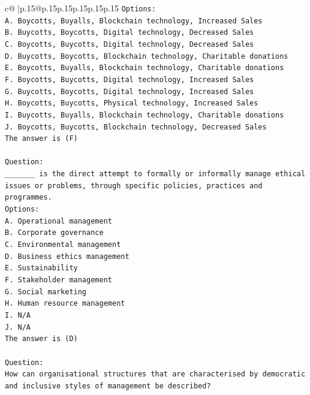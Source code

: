 \documentclass{article}
\begin{document}
{\begin{supertabular}{c@{$\;$}|p{.15\linewidth}@{}p{.15\linewidth}p{.15\linewidth}p{.15\linewidth}p{.15\linewidth}p{.15\linewidth}}
{{{\texttt{Options:} \\
\texttt{A. Boycotts, Buyalls, Blockchain technology, Increased Sales} \\
\texttt{B. Buycotts, Boycotts, Digital technology, Decreased Sales} \\
\texttt{C. Boycotts, Buycotts, Digital technology, Decreased Sales} \\
\texttt{D. Buycotts, Boycotts, Blockchain technology, Charitable donations} \\
\texttt{E. Boycotts, Buyalls, Blockchain technology, Charitable donations} \\
\texttt{F. Boycotts, Buycotts, Digital technology, Increased Sales} \\
\texttt{G. Buycotts, Boycotts, Digital technology, Increased Sales} \\
\texttt{H. Boycotts, Buycotts, Physical technology, Increased Sales} \\
\texttt{I. Buycotts, Buyalls, Blockchain technology, Charitable donations} \\
\texttt{J. Boycotts, Buycotts, Blockchain technology, Decreased Sales} \\
\texttt{The answer is (F)} \\
\\ 
\texttt{Question:} \\
\texttt{\_\_\_\_\_\_\_ is the direct attempt to formally or informally manage ethical issues or problems, through specific policies, practices and programmes.} \\
\texttt{Options:} \\
\texttt{A. Operational management} \\
\texttt{B. Corporate governance} \\
\texttt{C. Environmental management} \\
\texttt{D. Business ethics management} \\
\texttt{E. Sustainability} \\
\texttt{F. Stakeholder management} \\
\texttt{G. Social marketing} \\
\texttt{H. Human resource management} \\
\texttt{I. N/A} \\
\texttt{J. N/A} \\
\texttt{The answer is (D)} \\
\\ 
\texttt{Question:} \\
\texttt{How can organisational structures that are characterised by democratic and inclusive styles of management be described?} \\
}}}
\end{supertabular}}
\end{document}
